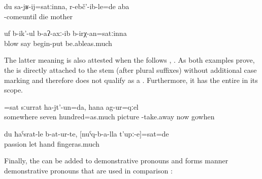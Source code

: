 \begin{exe}
	\ex	\label{ex:‎Until I came my mother died1}
	\gll	du	sa-jʁ-ij=satːinna,	r-ebč'-ib-le=de	aba\\
			-comeuntil	die	mother\\
	\glt	{}
	
		\ex	\label{ex:(The wind) began to blow as strong as it could}
	\gll	uf	b-ik'-ul	b-aʔ-axː-ib	b-irχ-an=satːinna\\
		blow	say	begin-put	be.ableas.much\\
	\glt	{}
\end{exe}


The latter meaning is also attested when the  follows  , . As both examples prove, the  is directly attached to the stem (after plural suffixes) without additional case marking and therefore does not qualify as a . Furthermore, it has the entire  in its scope.

\begin{exe}
	\ex	\label{ex:‎‎‎Around as much as 700 pictures I made when we went (there) now}
	=sat	sːurrat	ha-jt'-un=da,	hana	ag-ur=qːel\\
		somewhere	seven	hundred=as.much	picture	-take.away	now	gowhen\\
	\glt	{}

	\ex	\label{ex:‎‎‎The ones that I left in passion (i.e. that fell in love with me)}
	\gll	du	ħaˁsrat-le	b-at-ur-te,	[nuˁq-b-a-lla	t'upː-e]=sat=de\\
			passion	let hand	fingeras.much\\
	\glt	{}
\end{exe}

Finally, the  can be added to demonstrative pronouns and forms manner demonstrative pronouns that are used in comparison :

